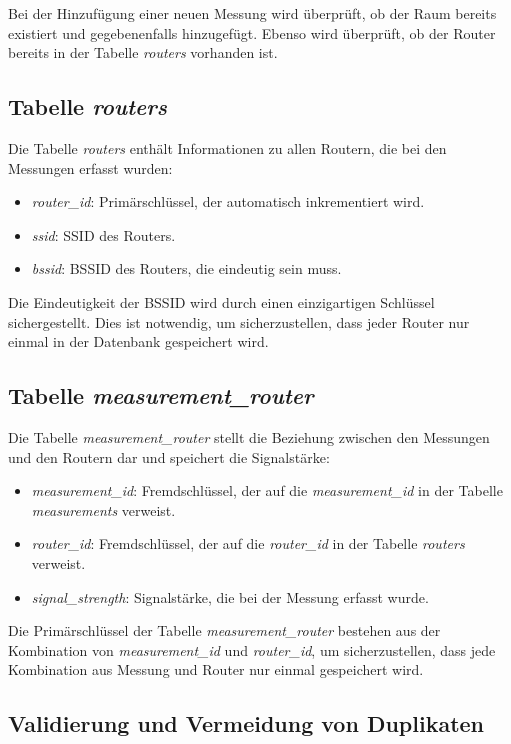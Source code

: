 Bei der Hinzufügung einer neuen Messung wird überprüft, ob der Raum bereits existiert und gegebenenfalls hinzugefügt. Ebenso wird überprüft, ob der Router bereits in der Tabelle \textit{routers} vorhanden ist.

\subsection{Tabelle \textit{routers}}

Die Tabelle \textit{routers} enthält Informationen zu allen Routern, die bei den Messungen erfasst wurden:
\begin{itemize}
    \item \textit{router\_id}: Primärschlüssel, der automatisch inkrementiert wird.
    \item \textit{ssid}: SSID des Routers.
    \item \textit{bssid}: BSSID des Routers, die eindeutig sein muss.
\end{itemize}

Die Eindeutigkeit der BSSID wird durch einen einzigartigen Schlüssel sichergestellt. Dies ist notwendig, um sicherzustellen, dass jeder Router nur einmal in der Datenbank gespeichert wird.

\subsection{Tabelle \textit{measurement\_router}}

Die Tabelle \textit{measurement\_router} stellt die Beziehung zwischen den Messungen und den Routern dar und speichert die Signalstärke:
\begin{itemize}
    \item \textit{measurement\_id}: Fremdschlüssel, der auf die \textit{measurement\_id} in der Tabelle \textit{measurements} verweist.
    \item \textit{router\_id}: Fremdschlüssel, der auf die \textit{router\_id} in der Tabelle \textit{routers} verweist.
    \item \textit{signal\_strength}: Signalstärke, die bei der Messung erfasst wurde.
\end{itemize}

Die Primärschlüssel der Tabelle \textit{measurement\_router} bestehen aus der Kombination von \textit{measurement\_id} und \textit{router\_id}, um sicherzustellen, dass jede Kombination aus Messung und Router nur einmal gespeichert wird.

\subsection{Validierung und Vermeidung von Duplikaten}


